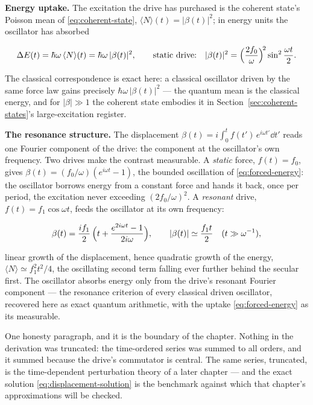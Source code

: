\medskip\noindent\textbf{Energy uptake.} The excitation the drive has purchased is the coherent state's Poisson mean of \eqref{eq:coherent-state}, $\langle N\rangle(t) = |\beta(t)|^2$; in energy units the oscillator has absorbed
\begin{linenomath}
    \begin{equation}
        \Delta E(t) = \hbar\omega\,\langle N\rangle(t) = \hbar\omega\,|\beta(t)|^2 ,
        \qquad\text{static drive:}\quad
        |\beta(t)|^2 = \Bigl(\frac{2f_0}{\omega}\Bigr)^{\!2}\sin^2\frac{\omega t}{2} .
        \label{eq:forced-energy}
    \end{equation}
\end{linenomath}
The classical correspondence is exact here: a classical oscillator driven by the same force law gains precisely $\hbar\omega\,|\beta(t)|^2$ --- the quantum mean is the classical energy, and for $|\beta| \gg 1$ the coherent state embodies it in Section~\ref{sec:coherent-states}'s large-excitation register.

\medskip\noindent\textbf{The resonance structure.} The displacement $\beta(t) = i\int_0^t f(t')\,e^{i\omega t'}\dd t'$ reads one Fourier component of the drive: the component at the oscillator's own frequency. Two drives make the contrast measurable. A \emph{static} force, $f(t) = f_0$, gives $\beta(t) = (f_0/\omega)(e^{i\omega t} - 1)$, the bounded oscillation of \eqref{eq:forced-energy}: the oscillator borrows energy from a constant force and hands it back, once per period, the excitation never exceeding $(2f_0/\omega)^2$. A \emph{resonant} drive, $f(t) = f_1\cos\omega t$, feeds the oscillator at its own frequency:
\begin{linenomath}
    \begin{equation*}
        \beta(t) = \frac{if_1}{2}\,\Bigl(t + \frac{e^{2i\omega t} - 1}{2i\omega}\Bigr),
        \qquad
        |\beta(t)| \simeq \frac{f_1 t}{2}\quad (t \gg \omega^{-1}) ,
    \end{equation*}
\end{linenomath}
linear growth of the displacement, hence quadratic growth of the energy, $\langle N\rangle \simeq f_1^2 t^2/4$, the oscillating second term falling ever further behind the secular first. The oscillator absorbs energy only from the drive's resonant Fourier component --- the resonance criterion of every classical driven oscillator, recovered here as exact quantum arithmetic, with the uptake \eqref{eq:forced-energy} as its measurable.

One honesty paragraph, and it is the boundary of the chapter. Nothing in the derivation was truncated: the time-ordered series was summed to all orders, and it summed because the drive's commutator is central. The same series, truncated, is the time-dependent perturbation theory of a later chapter --- and the exact solution \eqref{eq:displacement-solution} is the benchmark against which that chapter's approximations will be checked.

